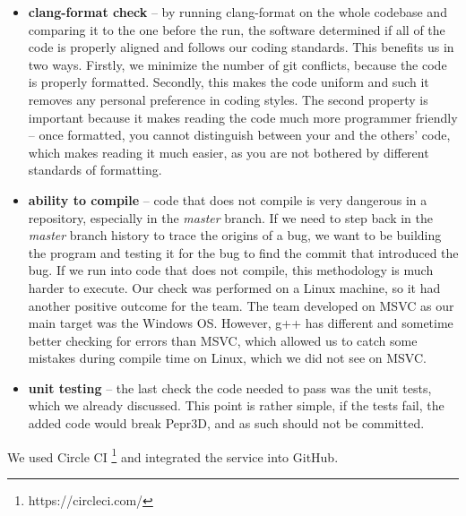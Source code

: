\begin{itemize}
\item \textbf{clang-format check} -- by running clang-format on the whole codebase and comparing it to the one before the run, the software determined if all of the code is properly aligned and follows our coding standards. This benefits us in two ways. Firstly, we minimize the number of git conflicts, because the code is properly formatted. Secondly, this makes the code uniform and such it removes any personal preference in coding styles. The second property is important because it makes reading the code much more programmer friendly -- once formatted, you cannot distinguish between your and the others' code, which makes reading it much easier, as you are not bothered by different standards of formatting.

\item \textbf{ability to compile} -- code that does not compile is very dangerous in a repository, especially in the \textit{master} branch. If we need to step back in the \textit{master} branch history to trace the origins of a bug, we want to be building the program and testing it for the bug to find the commit that introduced the bug. If we run into code that does not compile, this methodology is much harder to execute. Our check was performed on a Linux machine, so it had another positive outcome for the team. The team developed on MSVC as our main target was the Windows OS. However, g++ has different and sometime better checking for errors than MSVC, which allowed us to catch some mistakes during compile time on Linux, which we did not see on MSVC.

\item \textbf{unit testing} -- the last check the code needed to pass was the unit tests, which we already discussed. This point is rather simple, if the tests fail, the added code would break Pepr3D, and as such should not be committed.

\end{itemize}

We used Circle CI \footnote{https://circleci.com/} and integrated the service into GitHub.